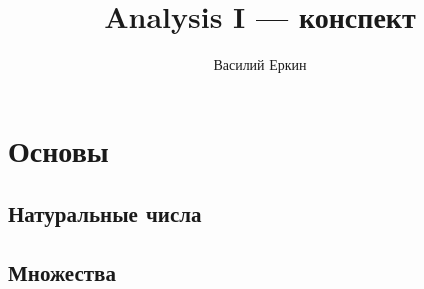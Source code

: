 \documentclass[12pt, a4paper, oneside]{book}
\title{Analysis I — конспект}
\author{Василий Еркин}
\date{}
\begin{document}
\frontmatter
\maketitle
\tableofcontents



\mainmatter
\part{Основы}

\setcounter{chapter}{1}
\chapter{Натуральные числа}
\setcounter{section}{0}




\setcounter{chapter}{2}
\chapter{Множества}
\setcounter{section}{0}




\end{document}
